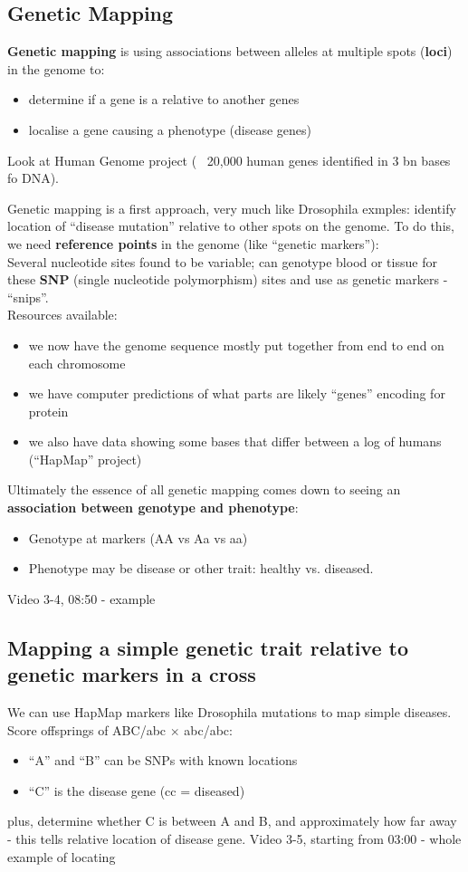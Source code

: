 \documentclass{scrartcl}
\begin{document}
\subsection{Genetic Mapping}
\label{sec:3-4} {\bf Genetic mapping } is using associations between alleles at
multiple spots ({\bf loci}) in the genome to:
\begin{itemize}
\item determine if a gene is a relative to another genes
\item localise a gene causing a phenotype (disease genes)
\end{itemize}
Look at Human Genome project (~ 20,000 human genes identified in 3 bn bases fo
DNA).

Genetic mapping is a first approach, very much like Drosophila exmples: identify
location of ``disease mutation'' relative to other spots on the genome. To do
this, we need {\bf reference points} in the genome (like ``genetic
markers''): \\
Several nucleotide sites found to be variable; can genotype blood or tissue for
these {\bf SNP} (single nucleotide polymorphism) sites and use as
genetic markers - ``snips''.\\
Resources available:
\begin{itemize}
\item we now have the genome sequence mostly put together from end to end on
  each chromosome
\item we have computer predictions of what parts are likely ``genes'' encoding
  for protein
\item we also have data showing some bases that differ between a log of humans
  (``HapMap'' project)
\end{itemize}
Ultimately the essence of all genetic mapping comes down to seeing an {\bf
  association between genotype and phenotype}:
\begin{itemize}
\item Genotype at markers (AA vs Aa vs aa)
\item Phenotype may be disease or other trait: healthy vs. diseased.
\end{itemize}
Video 3-4, 08:50 - example

\subsection{Mapping a simple genetic trait relative to genetic markers in a
  cross}
\label{sec:3-5}
We can use HapMap markers like Drosophila mutations to map simple diseases. \\
Score offsprings of ABC/abc $\times$ abc/abc:
\begin{itemize}
\item ``A'' and ``B'' can be SNPs with known locations
\item ``C'' is the disease gene (cc = diseased)
\end{itemize}
plus, determine whether C is between A and B, and approximately how far away -
this tells relative location of disease gene. Video 3-5, starting from 03:00 -
whole example of locating
\end{document}
